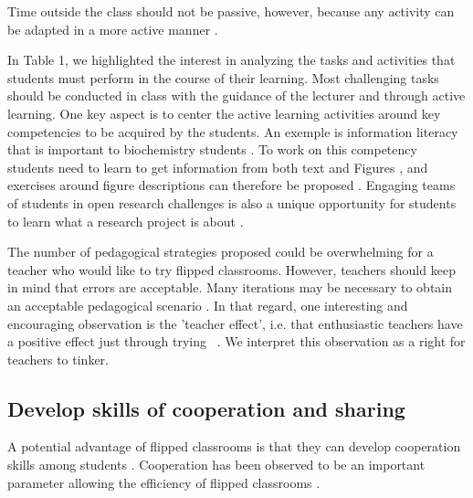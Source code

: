 \documentclass[10pt,letterpaper]{article}
\begin{document}
Time outside the class should not be passive, 
however, because any activity can be adapted in a more active manner \cite{chi_icap_2014}.

In Table 1, we highlighted the interest in analyzing the tasks and activities that students must perform in the course of their learning. 
Most challenging tasks should be conducted in class with the guidance of the lecturer and through active learning. 
One key aspect is to center the active learning activities around key competencies to be acquired by the students. An exemple is information literacy that is important to biochemistry students \cite{evans2020biochemical}. To work on this competency students need to learn to get information from both text and Figures \cite{constantin2016document}, and exercises around figure descriptions can therefore be proposed \cite{uzan_gerard_2021_6565239}. Engaging teams of students in open research challenges is also a unique opportunity for students to learn what a research project is about \cite{abdollahi2018meet}.

The number of pedagogical strategies proposed could be overwhelming for a teacher who would like to try flipped classrooms. 
However, teachers should keep in mind that errors are acceptable. 
Many iterations may be necessary to obtain an acceptable pedagogical scenario \cite{compeau_establishing_2019}. 
In that regard, one interesting and encouraging observation is the 'teacher effect', i.e. that enthusiastic teachers have a positive effect just through trying ~\cite{hattie_visible_2008}. 
We interpret this observation as a right for teachers to tinker.


\subsection{Develop skills of cooperation and sharing}

A potential advantage of flipped classrooms is that they can develop cooperation skills among students \cite{strayer_how_2012}. 
Cooperation has been observed to be an important parameter allowing the efficiency of flipped classrooms \cite{foldnes_flipped_2016}.
\end{document}
